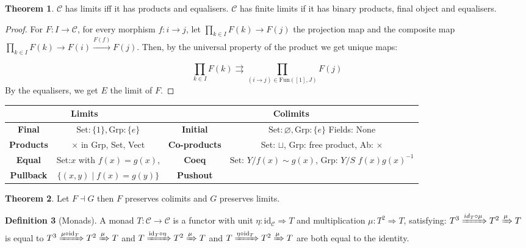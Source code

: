 \documentclass[a4paper,10pt]{article}
\theoremstyle{definition}
\newtheorem{theorem}{Theorem}
\newtheorem{definition}[theorem]{Definition}
\newcommand{\C}{\mathcal{C}}
\newcommand{\id}{\mathrm{id}}
\newcommand{\Set}{\mathrm{Set}}
\begin{document}
\begin{theorem}
    $\C$ has limits iff it has products and equalisers. $\C$ has finite limits if it has binary products, final object and equalisers.
\end{theorem}

\begin{proof}
    For $F \colon I \rightarrow \C$, for every morphism $f \colon i \rightarrow j$, let $\prod_{k \in I} F(k) \rightarrow F(j)$ the projection map and the composite map $\prod_{k \in I} F(k) \rightarrow F(i) \xrightarrow{F(f)} F(j)$. Then, by the universal property of the product we get unique maps: 

    \[
        \prod_{k \in I} F(k) \rightrightarrows \prod_{(i \rightarrow j) \in \mathrm{Fun}([1], J)} F(j)
    \]
    By the equalisers, we get $E$ the limit of $F$.
\end{proof}
\begin{center}
\begin{tabular}{ |c|c|c|c|}
    \hline
    
    \multicolumn{2}{|c|}{Limits} & \multicolumn{2}{|c|}{Colimits}\\
    \hline
    \textbf{Final}& $\Set: \{1\}, \mathrm{Grp}: \{e\}$ & \textbf{Initial} & $\Set: \varnothing, \mathrm{Grp}: \{e\}$ Fields: None\\
    \hline
    \textbf{Products} & $\times$ in Grp, Set, Vect & \textbf{Co-products} & Set: $\sqcup$, Grp: free product, Ab: $\times$ \\
    \hline
    \textbf{Equal} &Set:$x$ with $f(x) = g(x)$, & \textbf{Coeq} & $\Set$: $Y / f(x) \sim g(x)$, Grp: $Y/S$ $f(x)g(x)^{-1}$ \\
    \hline
    \textbf{Pullback} &$\{(x, y) \mid f(x) = g(y)\}$ & \textbf{Pushout}& \\
    \hline
\end{tabular}
\end{center}

\begin{theorem}
    Let $F \dashv G$ then $F$ preserves colimits and $G$ preserves limits.
\end{theorem}


\begin{definition}[Monads]
    A monad $T \colon \C \rightarrow \C$ is a functor with unit $\eta \colon \id_\C \Rightarrow T$ and multiplication $\mu \colon T^2 \Rightarrow T$, satisfying: $T^3 \xRightarrow{id_T \circ \mu} T^2 \xRightarrow{\mu} T$ is equal to $T^3 \xRightarrow{\mu \circ \id_T} T^2 \xRightarrow{\mu} T$ and $T \xRightarrow{\id_T \circ \eta} T^2 \xRightarrow{\mu} T$ and $T \xRightarrow{\eta \circ \id_T} T^2 \xRightarrow{\mu} T$ are both equal to the identity.
\end{definition}
\end{document}
